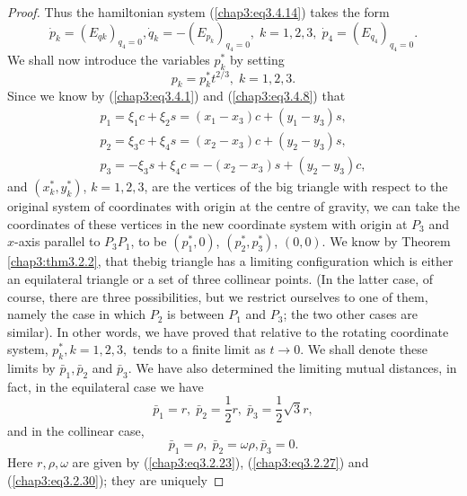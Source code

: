 \begin{proof}
Thus the hamiltonian system (\ref{chap3:eq3.4.14}) takes the form  
\begin{equation*}
\dot{p}_k = (E_{qk})_{q_4 =0}, \dot{q}_k = - (E_{p_k})_{q_4 = 0}, \; k
= 1,2,3, \; \dot{p}_4 = (E_{q_4})_{q_4 =
  0}.\tag{3.4.15}\label{chap3:eq3.4.15} 
\end{equation*}
We shall now introduce the variables $p^*_k$ by setting
\begin{equation*}
p_k = p^*_k t^{2/3}, \; k = 1,2,3. \tag{3.4.16}\label{chap3:eq3.4.16}
\end{equation*}
Since we know by (\ref{chap3:eq3.4.1}) and (\ref{chap3:eq3.4.8}) that
\begin{gather*}
p_1 = \xi_1 c + \xi_2 s = (x_1 - x_3 ) c+ (y_1 - y_3) s,\\ 
p_2 = \xi_3 c + \xi_4 s = (x_2 - x_3) c + (y_2 - y_3) s,\\
p_3 = - \xi_3 s + \xi_4 c = - (x_2 - x_3) s+ (y_2 - y_3) c,
\end{gather*}
and $(x^*_k, y^*_k)$, $k =1,2,3$, are the vertices of the big triangle
with respect to the original system of coordinates with origin at the
centre of gravity, we can take the coordinates of these vertices in
the new coordinate system with origin at $P_3$ and $x$-axis parallel
to $P_3 P_1$, to be $(p^*_1, 0)$, $(p^*_2, p^*_3)$, $(0,0)$. We know
by Theorem \ref{chap3:thm3.2.2}, that the\pageoriginale big triangle
has a limiting configuration which is either an equilateral triangle
or a set of three collinear points. (In the latter case, of course,
there are three possibilities, but we restrict ourselves to one of
them, namely the case in which $P_2$ is between $P_1 $ and $P_3$; the
two other cases are similar). In other words, we have proved that
relative to the rotating coordinate system, $p^*_k, k =1,2,3,$ tends
to a finite limit as $ t\to 0$. We shall denote these limits by
$\bar{p}_1, \bar{p}_2$ and $\bar{p}_3$.  We have also determined the
limiting mutual distances, in fact, in the equilateral case we have  
\begin{equation*}
\bar{p}_1 = r, \; \bar{p}_2 = \frac{1}{2} r, \; \bar{p}_3 =
\frac{1}{2} \sqrt{3} r, \tag{3.4.17}\label{chap3:eq3.4.17} 
\end{equation*}
and in the collinear case,
\begin{equation*}
\bar{p}_1 = \rho, \; \bar{p}_2 = \omega \rho, \bar{p}_3 = 0. 
\tag{3.4.18}\label{chap3:eq3.4.18}
\end{equation*}
Here $r, \rho, \omega$ are given by (\ref{chap3:eq3.2.23}),
(\ref{chap3:eq3.2.27}) and (\ref{chap3:eq3.2.30}); they are unique\-ly

\end{proof}
